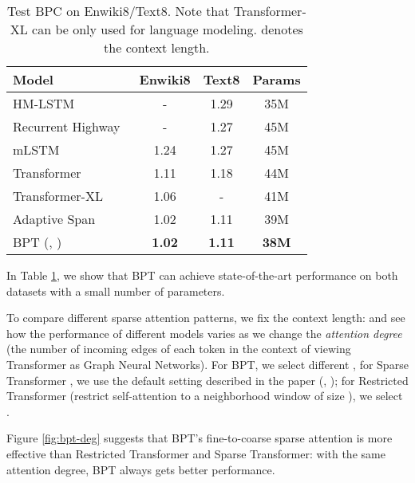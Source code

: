 \documentclass[11pt,a4paper]{article}
\begin{document}
\begin{table}[!htb]
\small\setlength{\tabcolsep}{2pt}
\centering
\begin{tabular}{p{14em}ccc}
\toprule
Model              & Enwiki8 & Text8 & Params \\
\midrule
HM-LSTM~\cite{ChungAB17}           & -      & 1.29 & 35M  \\
Recurrent Highway~\cite{ZillySKS17}  & -      & 1.27  & 45M \\
mLSTM~\cite{krause2016multiplicative}             & 1.24   & 1.27 & 45M \\
\midrule
Transformer~\cite{al2018character} & 1.11   & 1.18 & 44M \\
Transformer-XL~\cite{dai2019transformer}     & 1.06   & - & 41M \\
Adaptive Span~\cite{sukhbaatar2019adaptive} & 1.02 & 1.11 & 39M \\
\midrule
BPT (, )       & \bf{1.02} & \bf{1.11} & \bf{38M} \\
\bottomrule
\end{tabular}
\caption{Test BPC on Enwiki8/Text8.  Note that Transformer-XL can be only used for language modeling.  denotes the context length.}
\label{tbl:char}
\end{table}

In Table \ref{tbl:char}, we show that BPT can achieve state-of-the-art performance on both datasets with a small number of parameters.

To compare different sparse attention patterns, we fix the context length:  and see how the performance of different models varies as we change the \textit{attention degree} (the number of incoming edges of each token in the context of viewing Transformer as Graph Neural Networks). For BPT, we select different , for Sparse Transformer \citep{child2019sparsetransformer}, we use the default setting described in the paper (, ); for Restricted Transformer \citep{vaswani2017attention} (restrict self-attention to a neighborhood window of size ), we select .

Figure \ref{fig:bpt-deg} suggests that BPT's fine-to-coarse sparse attention is more effective than Restricted Transformer and Sparse Transformer: with the same attention degree, BPT always gets better performance.
\end{document}
